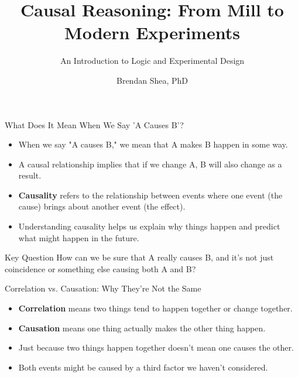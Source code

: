 \documentclass{beamer}
\title{Causal Reasoning: From Mill to Modern Experiments}
\subtitle{An Introduction to Logic and Experimental Design}
\author{Brendan Shea, PhD}
\begin{document}
\begin{frame}
    \titlepage
\end{frame}

\begin{frame}{What Does It Mean When We Say 'A Causes B'?}
    \begin{itemize}
        \item When we say "A causes B," we mean that A makes B happen in some way.
        \item A causal relationship implies that if we change A, B will also change as a result.
        \item \textbf{Causality} refers to the relationship between events where one event (the cause) brings about another event (the effect).
        \item Understanding causality helps us explain why things happen and predict what might happen in the future.
    \end{itemize}
    
    \begin{block}{Key Question}
        How can we be sure that A really causes B, and it's not just coincidence or something else causing both A and B?
    \end{block}
\end{frame}

\begin{frame}{Correlation vs. Causation: Why They're Not the Same}
    \begin{itemize}
        \item \textbf{Correlation} means two things tend to happen together or change together.
        \item \textbf{Causation} means one thing actually makes the other thing happen.
        \item Just because two things happen together doesn't mean one causes the other.
        \item Both events might be caused by a third factor we haven't considered.
    \end{itemize}
    
    \begin{center}
    \end{center}
\end{frame}
\end{document}
